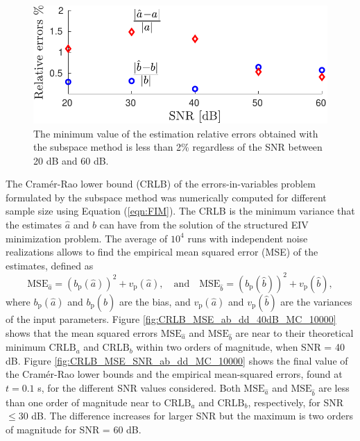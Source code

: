 \begin{figure}[!htbp]
\centering
\includegraphics[width=0.69\columnwidth]{./ChapterRampInput/fig/Fig_4.pdf} 
\caption{ \label{fig:rele_SNR_dd_10000} The minimum value of the estimation relative errors obtained with the subspace method is less than 2\% regardless of the SNR between 20 dB and 60 dB. }
\end{figure}

The Cram\'er-Rao lower bound (CRLB) of the errors-in-variables problem formulated by the subspace method was numerically computed for different sample size using Equation (\ref{eqn:FIM}).
The CRLB is the minimum variance that the estimates $\widehat{a}$ and $\widehat{b}$ can have from the solution of the structured EIV minimization problem. 
The average of $10^4$ runs with independent noise realizations allows to find the empirical mean squared error (MSE) of the estimates, defined as
\begin{equation} \mathrm{MSE}_{\widehat{a}} = \left(b_{\mathrm{p}}\left( \widehat{a} \right) \right)^2 + v_{\mathrm{p}} \left( \widehat{a} \right), \quad \text{and} \quad  \mathrm{MSE}_{\widehat{b}} = ( b_{\mathrm{p}} ( \widehat{b} ) )^2 + v_{\mathrm{p}} ( \widehat{b} ), \end{equation}
where $b_{\mathrm{p}} \left( \widehat{a} \right)$ and $b_{\mathrm{p}} ( \widehat{b} )$ are the bias, and $v_{\mathrm{p}} \left( \widehat{a} \right)$ and $v_{\mathrm{p}} ( \widehat{b} )$ are the variances of the input parameters.
Figure \ref{fig:CRLB_MSE_ab_dd_40dB_MC_10000} shows that the mean squared errors $\mathrm{MSE}_{\hat{a}}$ and $\mathrm{MSE}_{\hat{b}}$ are near to their theoretical minimum $\mathrm{CRLB}_{a}$ and $\mathrm{CRLB}_{b}$ within two orders of magnitude, when SNR = 40 dB.
Figure \ref{fig:CRLB_MSE_SNR_ab_dd_MC_10000} shows the final value of the Cram\'er-Rao lower bounds and the empirical mean-squared errors, found at $t=0.1$ s, for the different SNR values considered.
Both $\mathrm{MSE}_{\hat{a}}$ and $\mathrm{MSE}_{\hat{b}}$ are less than one order of magnitude near to $\mathrm{CRLB}_a$ and $\mathrm{CRLB}_{b}$, respectively, for SNR $\leq 30$ dB.
The difference increases for larger SNR but the maximum is two orders of magnitude for SNR = 60 dB.


